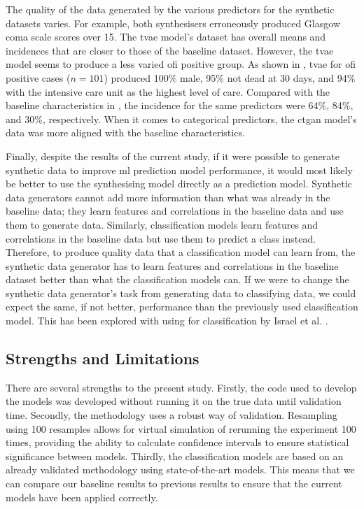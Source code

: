 \documentclass[12pt, a4paper]{article}
\begin{document}
The quality of the data generated by the various predictors for the synthetic datasets varies. For example, both
synthesisers erroneously produced Glasgow coma scale scores over 15. The \acrlong{tvae} model's dataset has overall
means and incidences that are closer to those of the baseline dataset. However, the \acrshort{tvae} model seems to
produce a less varied \acrshort{ofi} positive group. As shown in , \acrshort{tvae} for
\acrshort{ofi} positive cases ($n=101$) produced 100\% male, 95\% not dead at 30 days, and 94\% with the intensive care
unit as the highest level of care. Compared with the baseline characteristics in , the incidence for
the same predictors were 64\%, 84\%, and 30\%, respectively. When it comes to categorical predictors, the
\acrshort{ctgan} model's data was more aligned with the baseline characteristics.

Finally, despite the results of the current study, if it were possible to generate synthetic data to improve
\acrshort{ml} prediction model performance, it would most likely be better to use the synthesising model directly as a
prediction model. Synthetic data generators cannot add more information than what was already in the baseline data;
they learn features and correlations in the baseline data and use them to generate data. Similarly, classification
models learn features and correlations in the baseline data but use them to predict a class instead. Therefore, to
produce quality data that a classification model can learn from, the synthetic data generator has to learn features and
correlations in the baseline dataset better than what the classification models can. If we were to change the synthetic
data generator's task from generating data to classifying data, we could expect the same, if not better, performance
than the previously used classification model. This has been explored with using  for classification by
Israel et al. \cite{israel_generative_2017}.

\subsection{Strengths and Limitations}
There are several strengths to the present study. Firstly, the code used to develop the models was developed without
running it on the true data until validation time. Secondly, the methodology uses a robust way of validation.
Resampling using 100 resamples allows for virtual simulation of rerunning the experiment 100 times, providing the
ability to calculate confidence intervals to ensure statistical significance between models. Thirdly, the
classification models are based on an already validated methodology using state-of-the-art models. This means that we
can compare our baseline results to previous results to ensure that the current models have been applied correctly.
\end{document}
